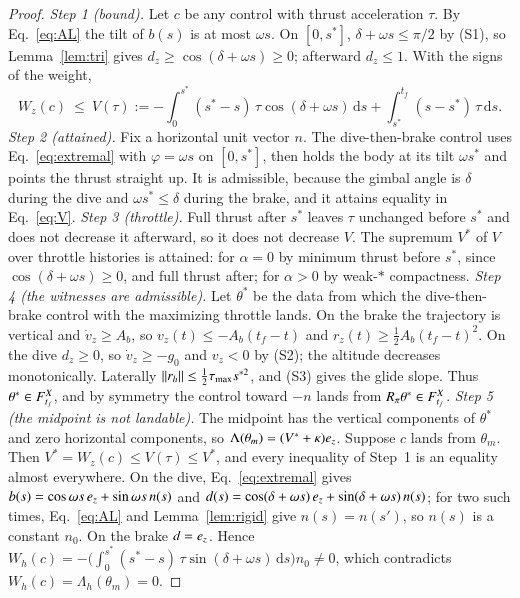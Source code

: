 \begin{proof}
\emph{Step 1 (bound).} Let $c$ be any control with thrust acceleration $\tau$. By Eq.~\eqref{eq:AL} the tilt of $b(s)$ is at
most $\omega s$. On $[0,s^*]$, $\delta+\omega s\le\pi/2$ by (S1), so Lemma~\ref{lem:tri} gives
$d_z\ge\cos(\delta+\omega s)\ge0$; afterward $d_z\le1$. With the signs of the weight,
\begin{equation}\label{eq:V}
W_z(c)\ \le\ V(\tau):=-\int_0^{s^*}(s^*-s)\,\tau\cos(\delta+\omega s)\,\mathrm ds+\int_{s^*}^{t_f}(s-s^*)\,\tau\,\mathrm ds .
\end{equation}
\emph{Step 2 (attained).} Fix a horizontal unit vector $n$. The dive-then-brake control uses Eq.~\eqref{eq:extremal} with
$\varphi=\omega s$ on $[0,s^*]$, then holds the body at its tilt $\omega s^*$ and points the thrust straight up. It is
admissible, because the gimbal angle is $\delta$ during the dive and $\omega s^*\le\delta$ during the brake, and it attains
equality in Eq.~\eqref{eq:V}.
\emph{Step 3 (throttle).} Full thrust after $s^*$ leaves $\tau$ unchanged before $s^*$ and does not decrease it afterward, so
it does not decrease $V$. The supremum $V^*$ of $V$ over throttle histories is attained: for $\alpha=0$ by minimum thrust
before $s^*$, since $\cos(\delta+\omega s)\ge0$, and full thrust after; for $\alpha>0$ by weak-$*$ compactness.
\emph{Step 4 (the witnesses are admissible).} Let $\theta^*$ be the data from which the dive-then-brake control with the
maximizing throttle lands. On the brake the trajectory is vertical and $\dot v_z\ge A_b$, so $v_z(t)\le-A_b(t_f-t)$ and
$r_z(t)\ge\tfrac12A_b(t_f-t)^2$. On the dive $d_z\ge0$, so $\dot v_z\ge-g_0$ and $v_z<0$ by (S2); the altitude decreases
monotonically. Laterally $\lVert r_h\rVert\le\tfrac12\tau_{\max}s^{*2}$, and (S3) gives the glide slope. Thus $\theta^*\in F^{X}_{t_f}$, and
by symmetry the control toward $-n$ lands from $R_\pi\theta^*\in F^{X}_{t_f}$.
\emph{Step 5 (the midpoint is not landable).} The midpoint has the vertical components of $\theta^*$ and zero horizontal
components, so $\Lambda(\theta_m)=(V^*+\kappa)e_z$. Suppose $c$ lands from $\theta_m$. Then $V^*=W_z(c)\le V(\tau)\le V^*$, and
every inequality of Step~1 is an equality almost everywhere. On the dive, Eq.~\eqref{eq:extremal} gives
$b(s)=\cos\omega s\,e_z+\sin\omega s\,n(s)$ and $d(s)=\cos(\delta+\omega s)\,e_z+\sin(\delta+\omega s)\,n(s)$; for two such
times, Eq.~\eqref{eq:AL} and Lemma~\ref{lem:rigid} give $n(s)=n(s')$, so $n(s)$ is a constant $n_0$. On the brake $d=e_z$.
Hence $W_h(c)=-\bigl(\int_0^{s^*}(s^*-s)\,\tau\sin(\delta+\omega s)\,\mathrm ds\bigr)n_0\ne0$, which contradicts
$W_h(c)=\Lambda_h(\theta_m)=0$.
\end{proof}

